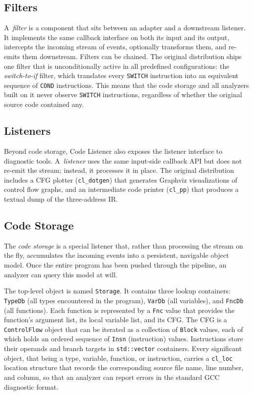 \subsection{Filters}

A~\emph{filter} is a component that sits between an adapter and a downstream listener. It implements the same callback interface on both its input and its output, intercepts the incoming stream of events, optionally transforms them, and re-emits them downstream. Filters can be chained. The original distribution ships one filter that is unconditionally active in all predefined configurations: the \emph{switch-to-if} filter, which translates every \texttt{SWITCH} instruction into an equivalent sequence of \texttt{COND} instructions. This means that the code storage and all analyzers built on it never observe \texttt{SWITCH} instructions, regardless of whether the original source code contained any.

\subsection{Listeners}

Beyond code storage, Code Listener also exposes the listener interface to diagnostic tools. A~\emph{listener} uses the same input-side callback API but does not re-emit the stream; instead, it processes it in place. The original distribution includes a CFG plotter (\texttt{cl\_dotgen}) that generates Graphviz visualizations of control flow graphs, and an intermediate code printer (\texttt{cl\_pp}) that produces a textual dump of the three-address IR.

\subsection{Code Storage}
\label{sec:code-storage}

The \emph{code storage} is a special listener that, rather than processing the stream on the fly, accumulates the incoming events into a persistent, navigable object model. Once the entire program has been pushed through the pipeline, an analyzer can query this model at will.

The top-level object is named \texttt{Storage}. It contains three lookup containers: \texttt{TypeDb} (all types encountered in the program), \texttt{VarDb} (all variables), and \texttt{FncDb} (all functions). Each function is represented by a \texttt{Fnc} value that provides the function's argument list, its local variable list, and its CFG. The CFG is a \texttt{ControlFlow} object that can be iterated as a collection of \texttt{Block} values, each of which holds an ordered sequence of \texttt{Insn} (instruction) values. Instructions store their operands and branch targets in \texttt{std::vector} containers. Every significant object, that being a type, variable, function, or instruction, carries a \texttt{cl\_loc} location structure that records the corresponding source file name, line number, and column, so that an analyzer can report errors in the standard GCC diagnostic format.

